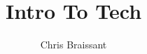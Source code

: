 \documentclass[english,12pt]{beamer}
\author[]{Chris Braissant}
\title[]{Intro To Tech}
\institute{Ban's Diving Resort}
\begin{document}
\begin{frame}
	\maketitle
\end{frame}


 
% 
% 
% 
% 
\end{document}
